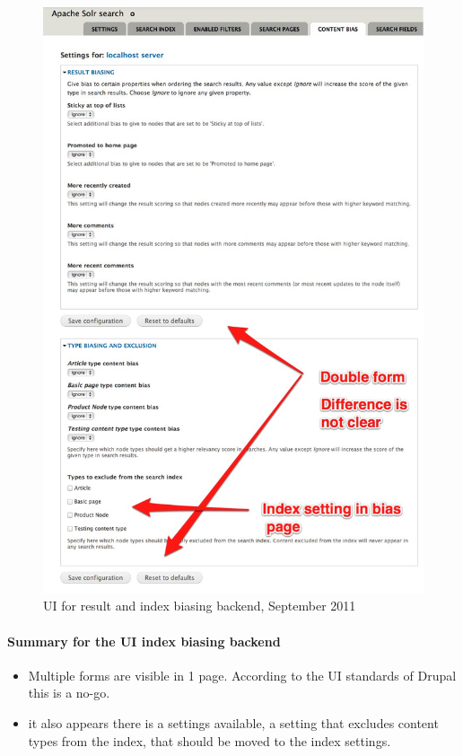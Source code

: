 \begin{figure}[H]
     \includegraphics[width=\textwidth/(2)]{images/apachesolr_ui_backend_september_2011_4.jpg}
     \caption{UI for result and index biasing backend, September 2011}
\end{figure}
\paragraph{Summary for the UI index biasing backend}
\begin{itemize}
\item Multiple forms are visible in 1 page. According to the UI standards of Drupal this is a no-go.
\item it also appears there is a settings available, a setting that excludes content types from the index, that should be moved to the index settings. 
\end{itemize}


